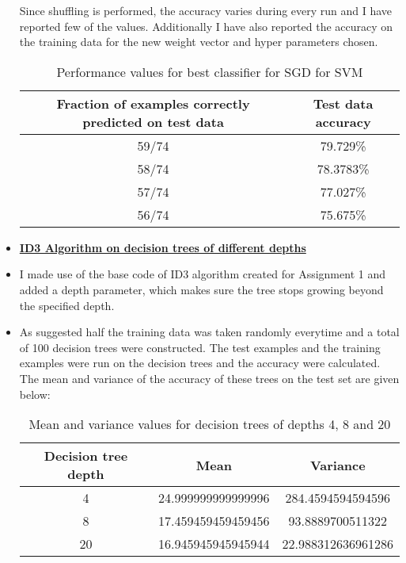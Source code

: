 \documentclass[11pt]{article}
\begin{document}
\begin{itemize}
Since shuffling is performed, the accuracy varies during every run and I have reported few of the values. Additionally I have also reported the accuracy on the training data for the new weight vector and hyper parameters chosen.

\begin{table}[h]
	\centering
	\begin{tabular}{|c|c| }
		\hline
		\textbf{Fraction of examples correctly predicted on test data} &\textbf{Test data accuracy}  \\
		\hline
		59/74 & 79.729\%  \\
		\hline
		58/74 & 78.3783\%   \\
		\hline
		57/74 & 77.027\%  \\
		\hline
		56/74 & 75.675\%   \\
		\hline
	\end{tabular}
\caption{Performance values for best classifier for SGD for SVM}
\label{t2}
\end{table}


\item[] \textbf{ \underline{ID3 Algorithm on decision trees of different depths}}

\item I made use of the base code of ID3 algorithm created for Assignment 1 and added a depth parameter, which makes sure the tree stops growing beyond the specified depth.

\item As suggested half the training data was taken randomly everytime and a total of 100 decision trees were constructed. The test examples and the training examples were run on the decision trees and the accuracy were calculated. The mean and variance of the accuracy of these trees on the test set are given below:

\begin{table}[h]
	\centering
	\begin{tabular}{|c|c|c| }
		\hline
		\textbf{Decision tree depth} &\textbf{Mean} & \textbf{Variance} \\
		\hline
		4 & 24.999999999999996 & 284.4594594594596  \\
		\hline
		8 & 17.459459459459456 & 93.8889700511322  \\
		\hline
		20 & 16.945945945945944 & 22.988312636961286 \\
		\hline
	
	\end{tabular}
	\caption{Mean and variance values for decision trees of depths 4, 8 and 20}
	\label{t2}
\end{table}


\end{itemize}
\end{document}
